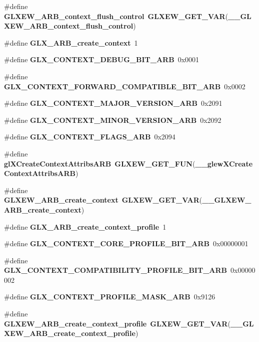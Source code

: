 \begin{DoxyCompactItemize}
\item 
\#define {\bf G\+L\+X\+E\+W\+\_\+\+A\+R\+B\+\_\+context\+\_\+flush\+\_\+control}~{\bf G\+L\+X\+E\+W\+\_\+\+G\+E\+T\+\_\+\+V\+AR}({\bf \+\_\+\+\_\+\+G\+L\+X\+E\+W\+\_\+\+A\+R\+B\+\_\+context\+\_\+flush\+\_\+control})
\item 
\#define {\bf G\+L\+X\+\_\+\+A\+R\+B\+\_\+create\+\_\+context}~1
\item 
\#define {\bf G\+L\+X\+\_\+\+C\+O\+N\+T\+E\+X\+T\+\_\+\+D\+E\+B\+U\+G\+\_\+\+B\+I\+T\+\_\+\+A\+RB}~0x0001
\item 
\#define {\bf G\+L\+X\+\_\+\+C\+O\+N\+T\+E\+X\+T\+\_\+\+F\+O\+R\+W\+A\+R\+D\+\_\+\+C\+O\+M\+P\+A\+T\+I\+B\+L\+E\+\_\+\+B\+I\+T\+\_\+\+A\+RB}~0x0002
\item 
\#define {\bf G\+L\+X\+\_\+\+C\+O\+N\+T\+E\+X\+T\+\_\+\+M\+A\+J\+O\+R\+\_\+\+V\+E\+R\+S\+I\+O\+N\+\_\+\+A\+RB}~0x2091
\item 
\#define {\bf G\+L\+X\+\_\+\+C\+O\+N\+T\+E\+X\+T\+\_\+\+M\+I\+N\+O\+R\+\_\+\+V\+E\+R\+S\+I\+O\+N\+\_\+\+A\+RB}~0x2092
\item 
\#define {\bf G\+L\+X\+\_\+\+C\+O\+N\+T\+E\+X\+T\+\_\+\+F\+L\+A\+G\+S\+\_\+\+A\+RB}~0x2094
\item 
\#define {\bf gl\+X\+Create\+Context\+Attribs\+A\+RB}~{\bf G\+L\+X\+E\+W\+\_\+\+G\+E\+T\+\_\+\+F\+UN}({\bf \+\_\+\+\_\+glew\+X\+Create\+Context\+Attribs\+A\+RB})
\item 
\#define {\bf G\+L\+X\+E\+W\+\_\+\+A\+R\+B\+\_\+create\+\_\+context}~{\bf G\+L\+X\+E\+W\+\_\+\+G\+E\+T\+\_\+\+V\+AR}({\bf \+\_\+\+\_\+\+G\+L\+X\+E\+W\+\_\+\+A\+R\+B\+\_\+create\+\_\+context})
\item 
\#define {\bf G\+L\+X\+\_\+\+A\+R\+B\+\_\+create\+\_\+context\+\_\+profile}~1
\item 
\#define {\bf G\+L\+X\+\_\+\+C\+O\+N\+T\+E\+X\+T\+\_\+\+C\+O\+R\+E\+\_\+\+P\+R\+O\+F\+I\+L\+E\+\_\+\+B\+I\+T\+\_\+\+A\+RB}~0x00000001
\item 
\#define {\bf G\+L\+X\+\_\+\+C\+O\+N\+T\+E\+X\+T\+\_\+\+C\+O\+M\+P\+A\+T\+I\+B\+I\+L\+I\+T\+Y\+\_\+\+P\+R\+O\+F\+I\+L\+E\+\_\+\+B\+I\+T\+\_\+\+A\+RB}~0x00000002
\item 
\#define {\bf G\+L\+X\+\_\+\+C\+O\+N\+T\+E\+X\+T\+\_\+\+P\+R\+O\+F\+I\+L\+E\+\_\+\+M\+A\+S\+K\+\_\+\+A\+RB}~0x9126
\item 
\#define {\bf G\+L\+X\+E\+W\+\_\+\+A\+R\+B\+\_\+create\+\_\+context\+\_\+profile}~{\bf G\+L\+X\+E\+W\+\_\+\+G\+E\+T\+\_\+\+V\+AR}({\bf \+\_\+\+\_\+\+G\+L\+X\+E\+W\+\_\+\+A\+R\+B\+\_\+create\+\_\+context\+\_\+profile})
\item 

\end{DoxyCompactItemize}
